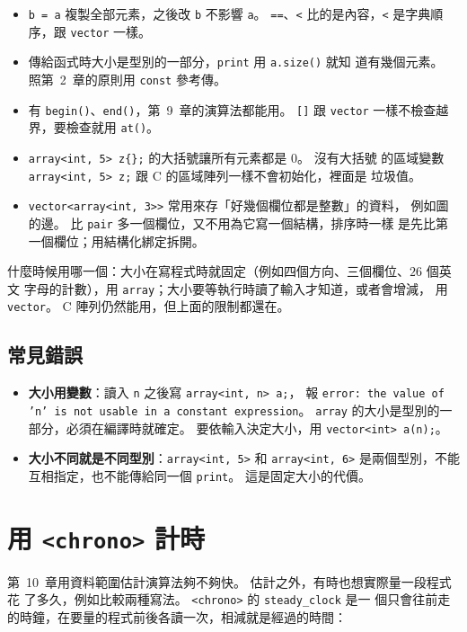 \begin{itemize}
\item \texttt{b = a} 複製全部元素，之後改 \texttt{b} 不影響 \texttt{a}。
\texttt{==}、\texttt{<} 比的是內容，\texttt{<} 是字典順序，跟 \texttt{vector}
一樣。
\item 傳給函式時大小是型別的一部分，\texttt{print} 用 \texttt{a.size()} 就知
道有幾個元素。 照第~2~章的原則用 \texttt{const} 參考傳。
\item 有 \texttt{begin()}、\texttt{end()}，第~9~章的演算法都能用。
\texttt{[]} 跟 \texttt{vector} 一樣不檢查越界，要檢查就用 \texttt{at()}。
\item \texttt{array<int, 5> z\{\};} 的大括號讓所有元素都是 $0$。 沒有大括號
的區域變數 \texttt{array<int, 5> z;} 跟 C 的區域陣列一樣不會初始化，裡面是
垃圾值。
\item \texttt{vector<array<int, 3>>} 常用來存「好幾個欄位都是整數」的資料，
例如圖的邊。 比 \texttt{pair} 多一個欄位，又不用為它寫一個結構，排序時一樣
是先比第一個欄位；用結構化綁定拆開。
\end{itemize}

什麼時候用哪一個：大小在寫程式時就固定（例如四個方向、三個欄位、$26$ 個英文
字母的計數），用 \texttt{array}；大小要等執行時讀了輸入才知道，或者會增減，
用 \texttt{vector}。 C 陣列仍然能用，但上面的限制都還在。

\subsection{常見錯誤}

\begin{itemize}
\item \textbf{大小用變數}：讀入 \texttt{n} 之後寫 \texttt{array<int, n> a;}，
報 \texttt{error: the value of 'n' is not usable in a constant
expression}。 \texttt{array} 的大小是型別的一部分，必須在編譯時就確定。
要依輸入決定大小，用 \texttt{vector<int> a(n);}。
\item \textbf{大小不同就是不同型別}：\texttt{array<int, 5>} 和
\texttt{array<int, 6>} 是兩個型別，不能互相指定，也不能傳給同一個
\texttt{print}。 這是固定大小的代價。
\end{itemize}

\section{用 \texttt{<chrono>} 計時}
\label{sec:chrono}

第~10~章用資料範圍估計演算法夠不夠快。 估計之外，有時也想實際量一段程式花
了多久，例如比較兩種寫法。 \texttt{<chrono>} 的 \texttt{steady\_clock} 是一
個只會往前走的時鐘，在要量的程式前後各讀一次，相減就是經過的時間：

